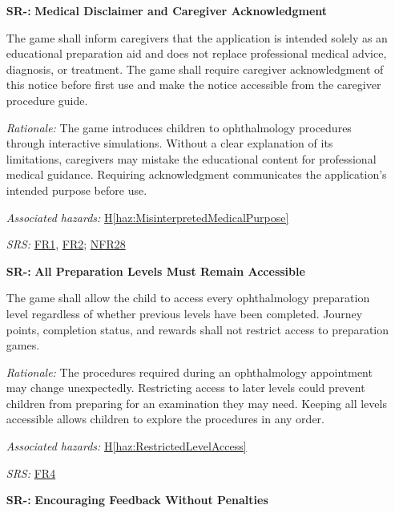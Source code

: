 \documentclass{article}
\newcounter{hazard}
\newcommand{\hazref}[1]{\hyperref[haz:#1]{H\ref*{haz:#1}}}
\newcounter{sr}
\newcommand{\srdef}[1]{\refstepcounter{sr}\label{sr:#1}\textbf{SR-\thesr:}}
\newcommand{\srsurl}{https://team-hindsight.github.io/ophthamology-game/SRS-IEEE/SRS.pdf}
\newcommand{\srsfrref}[2]{\href{\srsurl\#nameddest=#1}{FR#2}}
\newcommand{\srsnfrref}[2]{\href{\srsurl\#nameddest=#1}{NFR#2}}
\begin{document}
\begin{itemize}[leftmargin=1.5cm, labelwidth=1.3cm, labelsep=0.2cm,
  align=left, itemsep=1.2em, parsep=0.6em]
\textit{Rationale:} Child-life experts judge emotional suitability, which the
clinical review does not cover. This matters more in a game, where story and
excitement are added to the medical content.

\textit{Associated hazards:} \hazref{SensationsHidden}, \hazref{Frightening}

\textit{SRS:} \srsnfrref{NFR_ChildSafe}{2}, \srsnfrref{NFR_Language}{6}

\item[\srdef{MedicalDisclaimer}]
\textbf{Medical Disclaimer and Caregiver Acknowledgment}

The game shall inform caregivers that the
application is intended solely as an educational
preparation aid and does not replace professional
medical advice, diagnosis, or treatment.
The game shall require caregiver acknowledgment
of this notice before first use and make the
notice accessible from the caregiver procedure guide.

\textit{Rationale:}
The game introduces children to ophthalmology
procedures through interactive simulations.
Without a clear explanation of its limitations,
caregivers may mistake the educational content
for professional medical guidance. Requiring
acknowledgment communicates the application's
intended purpose before use.

\textit{Associated hazards:}
\hazref{MisinterpretedMedicalPurpose}

\textit{SRS:} \srsfrref{FR_MedicalNotice}{1}, \srsfrref{FR_RecordAck}{2}; \srsnfrref{NFR_NoClaims}{28}

\item[\srdef{AllLevelsAccessible}]
\textbf{All Preparation Levels Must Remain Accessible}

The game shall allow the child to access every
ophthalmology preparation level regardless of
whether previous levels have been completed.
Journey points, completion status, and rewards
shall not restrict access to preparation games.

\textit{Rationale:}
The procedures required during an ophthalmology
appointment may change unexpectedly. Restricting
access to later levels could prevent children from
preparing for an examination they may need.
Keeping all levels accessible allows children
to explore the procedures in any order.

\textit{Associated hazards:}
\hazref{RestrictedLevelAccess}

\textit{SRS:} \srsfrref{FR_StartLevel}{4}

\item[\srdef{NonPunitiveFeedback}]
\textbf{Encouraging Feedback Without Penalties}


\end{itemize}
\end{document}
